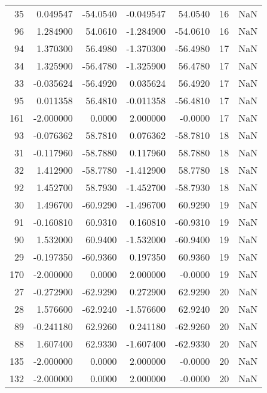 \begin{tabular}{rrrrrrr}
 35 &   0.049547 &  -54.0540 &  -0.049547 &     54.0540 &          16 & NaN \\
 96 &   1.284900 &   54.0610 &  -1.284900 &    -54.0610 &          16 & NaN \\
 94 &   1.370300 &   56.4980 &  -1.370300 &    -56.4980 &          17 & NaN \\
 34 &   1.325900 &  -56.4780 &  -1.325900 &     56.4780 &          17 & NaN \\
 33 &  -0.035624 &  -56.4920 &   0.035624 &     56.4920 &          17 & NaN \\
 95 &   0.011358 &   56.4810 &  -0.011358 &    -56.4810 &          17 & NaN \\
161 &  -2.000000 &    0.0000 &   2.000000 &     -0.0000 &          17 & NaN \\
 93 &  -0.076362 &   58.7810 &   0.076362 &    -58.7810 &          18 & NaN \\
 31 &  -0.117960 &  -58.7880 &   0.117960 &     58.7880 &          18 & NaN \\
 32 &   1.412900 &  -58.7780 &  -1.412900 &     58.7780 &          18 & NaN \\
 92 &   1.452700 &   58.7930 &  -1.452700 &    -58.7930 &          18 & NaN \\
 30 &   1.496700 &  -60.9290 &  -1.496700 &     60.9290 &          19 & NaN \\
 91 &  -0.160810 &   60.9310 &   0.160810 &    -60.9310 &          19 & NaN \\
 90 &   1.532000 &   60.9400 &  -1.532000 &    -60.9400 &          19 & NaN \\
 29 &  -0.197350 &  -60.9360 &   0.197350 &     60.9360 &          19 & NaN \\
170 &  -2.000000 &    0.0000 &   2.000000 &     -0.0000 &          19 & NaN \\
 27 &  -0.272900 &  -62.9290 &   0.272900 &     62.9290 &          20 & NaN \\
 28 &   1.576600 &  -62.9240 &  -1.576600 &     62.9240 &          20 & NaN \\
 89 &  -0.241180 &   62.9260 &   0.241180 &    -62.9260 &          20 & NaN \\
 88 &   1.607400 &   62.9330 &  -1.607400 &    -62.9330 &          20 & NaN \\
135 &  -2.000000 &    0.0000 &   2.000000 &     -0.0000 &          20 & NaN \\
132 &  -2.000000 &    0.0000 &   2.000000 &     -0.0000 &          20 & NaN \\

\end{tabular}
